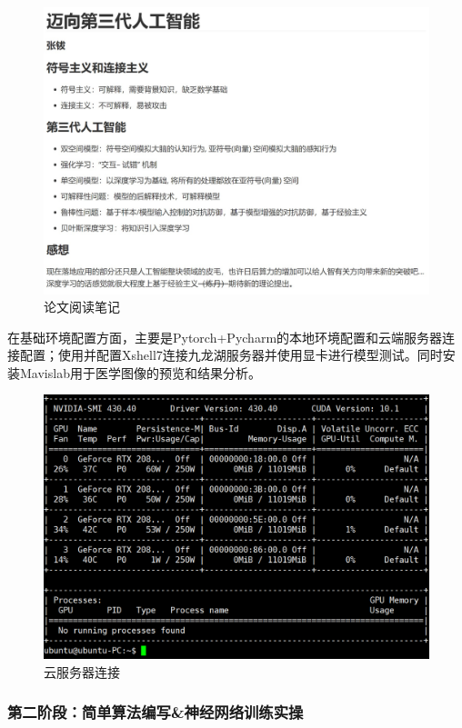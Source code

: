 \documentclass[lang=cn,11pt,a4paper,cite=numbers]{elegantpaper}
\begin{document}
\begin{figure}[H]
    \centering
    \includegraphics[scale=0.5]{./image/前期总结/Note.jpg}
    \caption{论文阅读笔记}
    \label{fig:Note}
\end{figure}

在基础环境配置方面，主要是Pytorch+Pycharm的本地环境配置和云端服务器连接配置；使用并配置Xshell7连接九龙湖服务器并使用显卡进行模型测试。同时安装Mavislab用于医学图像的预览和结果分析。

\begin{figure}[H]
    \centering
    \includegraphics[scale=0.3]{./image/前期总结/Server.png}
    \caption{云服务器连接}
    \label{fig:Server}
\end{figure}

\subsubsection{第二阶段：简单算法编写\&神经网络训练实操}
\end{document}
